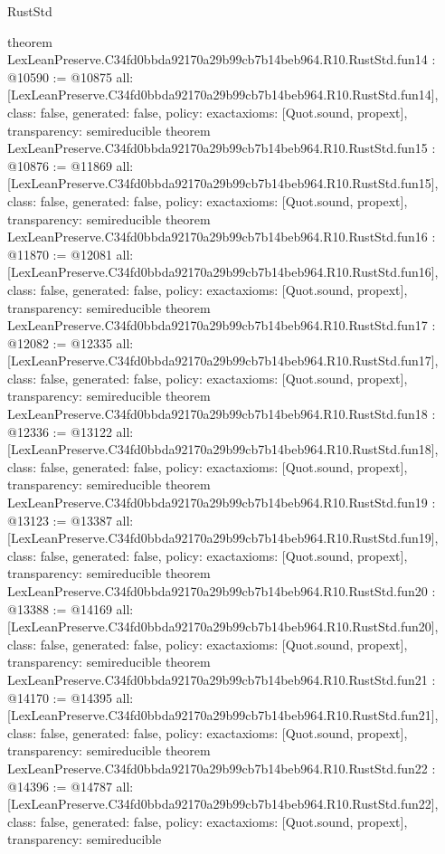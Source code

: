 \begin{lexlean}{RustStd}
\begin{coremodule}
{}
theorem LexLeanPreserve.C34fd0bbda92170a29b99cb7b14beb964.R10.RustStd.fun14 : @10590 := @10875 {
  all: [LexLeanPreserve.C34fd0bbda92170a29b99cb7b14beb964.R10.RustStd.fun14],
  class: false,
  generated: false,
  policy: exact{axioms: [Quot.sound, propext]},
  transparency: semireducible
}
theorem LexLeanPreserve.C34fd0bbda92170a29b99cb7b14beb964.R10.RustStd.fun15 : @10876 := @11869 {
  all: [LexLeanPreserve.C34fd0bbda92170a29b99cb7b14beb964.R10.RustStd.fun15],
  class: false,
  generated: false,
  policy: exact{axioms: [Quot.sound, propext]},
  transparency: semireducible
}
theorem LexLeanPreserve.C34fd0bbda92170a29b99cb7b14beb964.R10.RustStd.fun16 : @11870 := @12081 {
  all: [LexLeanPreserve.C34fd0bbda92170a29b99cb7b14beb964.R10.RustStd.fun16],
  class: false,
  generated: false,
  policy: exact{axioms: [Quot.sound, propext]},
  transparency: semireducible
}
theorem LexLeanPreserve.C34fd0bbda92170a29b99cb7b14beb964.R10.RustStd.fun17 : @12082 := @12335 {
  all: [LexLeanPreserve.C34fd0bbda92170a29b99cb7b14beb964.R10.RustStd.fun17],
  class: false,
  generated: false,
  policy: exact{axioms: [Quot.sound, propext]},
  transparency: semireducible
}
theorem LexLeanPreserve.C34fd0bbda92170a29b99cb7b14beb964.R10.RustStd.fun18 : @12336 := @13122 {
  all: [LexLeanPreserve.C34fd0bbda92170a29b99cb7b14beb964.R10.RustStd.fun18],
  class: false,
  generated: false,
  policy: exact{axioms: [Quot.sound, propext]},
  transparency: semireducible
}
theorem LexLeanPreserve.C34fd0bbda92170a29b99cb7b14beb964.R10.RustStd.fun19 : @13123 := @13387 {
  all: [LexLeanPreserve.C34fd0bbda92170a29b99cb7b14beb964.R10.RustStd.fun19],
  class: false,
  generated: false,
  policy: exact{axioms: [Quot.sound, propext]},
  transparency: semireducible
}
theorem LexLeanPreserve.C34fd0bbda92170a29b99cb7b14beb964.R10.RustStd.fun20 : @13388 := @14169 {
  all: [LexLeanPreserve.C34fd0bbda92170a29b99cb7b14beb964.R10.RustStd.fun20],
  class: false,
  generated: false,
  policy: exact{axioms: [Quot.sound, propext]},
  transparency: semireducible
}
theorem LexLeanPreserve.C34fd0bbda92170a29b99cb7b14beb964.R10.RustStd.fun21 : @14170 := @14395 {
  all: [LexLeanPreserve.C34fd0bbda92170a29b99cb7b14beb964.R10.RustStd.fun21],
  class: false,
  generated: false,
  policy: exact{axioms: [Quot.sound, propext]},
  transparency: semireducible
}
theorem LexLeanPreserve.C34fd0bbda92170a29b99cb7b14beb964.R10.RustStd.fun22 : @14396 := @14787 {
  all: [LexLeanPreserve.C34fd0bbda92170a29b99cb7b14beb964.R10.RustStd.fun22],
  class: false,
  generated: false,
  policy: exact{axioms: [Quot.sound, propext]},
  transparency: semireducible
}
\end{coremodule}
\end{lexlean}
